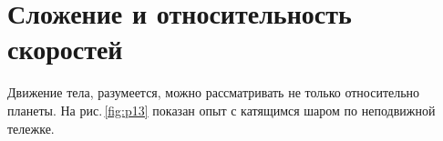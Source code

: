 \documentclass[main.tex]{subfiles}
\begin{document}


 

 

 
   

\section{Сложение и относительность скоростей}


Движение тела, разумеется, можно рассматривать не только относительно планеты. На рис.\,\ref{fig:p13} показан опыт с катящимся шаром по неподвижной тележке.
\end{document}
